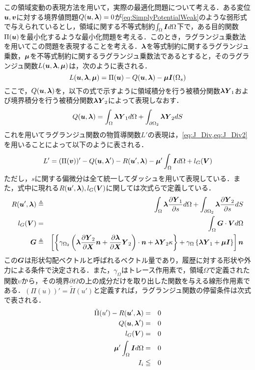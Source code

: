 この領域変動の表現方法を用いて，実際の最適化問題について考える．ある変位$ \bd{u} ,\bd{v}$に対する境界値問題$ Q(\bd{u},\bd{\lambda})=0 $が\eqref{eq:SimplyPotentialWeak}のような弱形式で与えられているとし，領域に関する不等式制約$ \int_{\Omega} \bd{I} d\Omega$下で，ある目的関数$ \Pi(\bd{u}) $を最小化するような最小化問題を考える．このとき，ラグランジュ乗数法を用いてこの問題を表現することを考える．$ \bd{\lambda} $を等式制約に関するラグランジュ乗数，$ \bd{\mu} $を不等式制約に関するラグランジュ乗数法であるとすると，そのラグランジュ関数$ L(\bd{u},\bd{\lambda},\bd{\mu}) $は，次のように表される．
\begin{equation}\label{eq:LagrangeFuncEq}
	L(\bd{u},\bd{\lambda},\bd{\mu}) = \Pi(\bd{u}) -  Q(\bd{u},\bd{\lambda}) - \bd{\mu} \bd{I}(\Omega_s)
\end{equation}
ここで，$ Q(\bd{u},\bd{\lambda}) $を，以下の式で示すように領域積分を行う被積分関数$ \bd{\lambda} \bd{Y}_1 $および境界積分を行う被積分関数$ \bd{\lambda} \bd{Y}_2$によって表現しなおす．
\begin{equation}\label{eq:Y1Y2_Eq}
	Q(\bd{u},\bd{\lambda}) = \int_{\Omega} \bd{\lambda} \bd{Y}_1 d\Omega + \int_{\partial \Omega_2} \bd{\lambda} \bd{Y}_2 dS
\end{equation}
これを用いてラグランジュ関数の物質導関数$ L' $の表現は，\eqref{eq:J_Div,eq:J_Div2}を用いることによって以下のように表される．
\begin{equation}\label{eq:LagrangeDivEq}
	L' =  (\Pi(\bd{v}))' - Q(\bd{u},\bd{\lambda}') - R(\bd{u}',\bd{\lambda}) - \bd{\mu}' \int_{\Omega} \bd{I} d\Omega +l_G(\Vv)
\end{equation}
ただし，$ s $に関する偏微分は全て統一してダッシュを用いて表現している．また，式中に現れる$ R(\bd{u}',\bd{\lambda}),l_G(\Vv) $に関しては次式らで定義している．
\begin{eqnarray}\label{eq:DefR_and_l_G}
	R(\bd{u}',\bd{\lambda}) &\triangleq& \int_{\Omega} \bd{\lambda} \partdf{\bd{Y}_1}{s} d\Omega + \int_{\partial \Omega_2} \bd{\lambda} \partdf{\bd{Y}_2}{s} dS \\
	l_G(\bd{V}) &=& \int_{\Omega} \bd{G}\cdot \bd{V} d\Omega \\
	\bd{G} &\triangleq& \left[\left\{\gamma_{\Omega_2} \left(\bd{\lambda}  \partdf{\bd{Y}_2}{\bd{X}} \bd{n} + \partdf{\bd{\lambda}}{\bd{X}} \bd{Y}_2 \right)\cdot \bd{n} +\bd{\lambda} \bd{Y}_2 \kappa \right\} + \gamma_{\Omega} \left\{ \bd{\lambda} \bd{Y}_1 + \bd{\mu} \bd{I} \right\}\right] \bd{n}
\end{eqnarray}
この$ \bd{G} $は形状勾配ベクトルと呼ばれるベクトル量であり，履歴に対する形状や外力による条件で決定される．また，$ \gamma_{\Omega} $はトレース作用素で，領域$ \Omega $で定義された関数$ \upsilon $から，その境界$ \partial \Omega $の上の成分だけを取り出した関数を与える線形作用素である．$ (\Pi(u))' = \tilde{\Pi}(u')$と定義すれば，ラグランジュ関数の停留条件は次式で表される．
\begin{eqnarray}\label{eq:DelLagrangeEq}
	\tilde{\Pi}(u') - R(\bd{u}',\bd{\lambda}) &=& 0 \\
	Q(\bd{u},\bd{\lambda}') &=& 0 \\
	l_G(\Vv)&=&0 \\
	\bd{\mu}'\int_{\Omega} \bd{I} d\Omega &=& 0 \\
	I_i&\leqq&0
\end{eqnarray}
